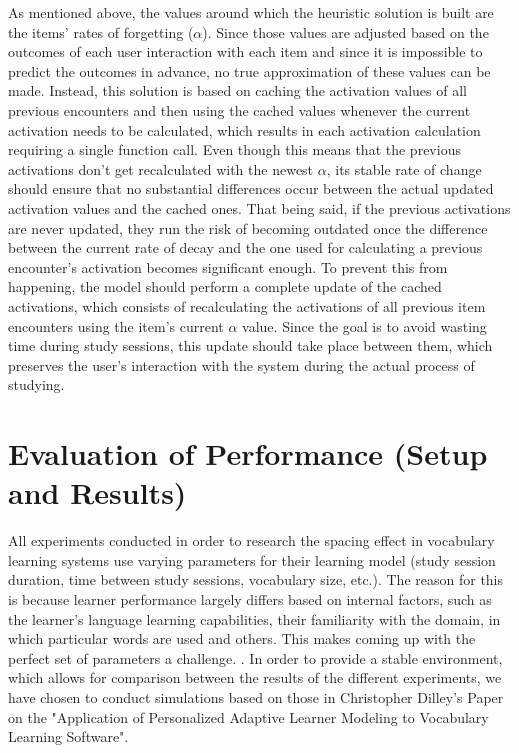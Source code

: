 \documentclass[a4paper]{report}
\begin{document}
As mentioned above, the values around which the heuristic solution is built are the items' rates of forgetting ($\alpha$). Since those values are adjusted based on the outcomes of each user interaction with each item and since it is impossible to predict the outcomes in advance, no true approximation of these values can be made. Instead, this solution is based on caching the activation values of all previous encounters and then using the cached values whenever the current activation needs to be calculated, which results in each activation calculation requiring a single function call. Even though this means that the previous activations don't get recalculated with the newest $\alpha$, its stable rate of change should ensure that no substantial differences occur between the actual updated activation values and the cached ones. That being said, if the previous activations are never updated, they run the risk of becoming outdated once the difference between the current rate of decay and the one used for calculating a previous encounter's activation becomes significant enough. To prevent this from happening, the model should perform a complete update of the cached activations, which consists of recalculating the activations of all previous item encounters using the item's current $\alpha$ value. Since the goal is to avoid wasting time during study sessions, this update should take place between them, which preserves the user's interaction with the system during the actual process of studying.



\chapter{Evaluation of Performance (Setup and Results)}
All experiments conducted in order to research the spacing effect in vocabulary learning systems use varying parameters for their learning model (study session duration, time between study sessions, vocabulary size, etc.). The reason for this is because learner performance largely differs based on internal factors, such as the learner's language learning capabilities, their familiarity with the domain, in which particular words are used and others. This makes coming up with the perfect set of parameters a challenge. \cite{woudenberg08}. In order to provide a stable environment, which allows for comparison between the results of the different experiments, we have chosen to conduct simulations based on those in Christopher Dilley's Paper on the "Application of Personalized Adaptive Learner Modeling to Vocabulary Learning Software". \cite{dilley17}
\end{document}
